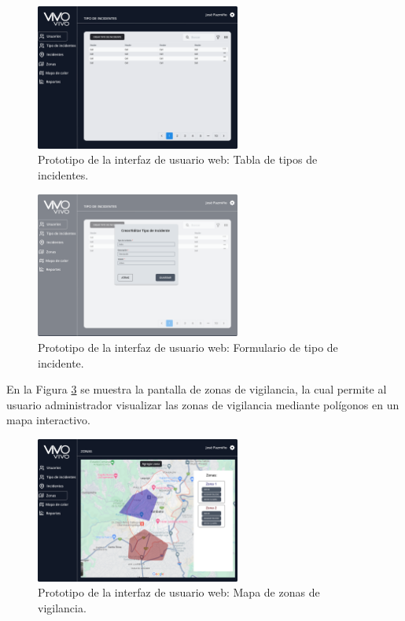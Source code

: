 \begin{figure}[H]
    \centering
    \includegraphics[width=0.6\textwidth]{chapters/III-resultados-y-discusion/resources/images/prototipo-tabla-tipos-incidentes-web.png}
    \caption{Prototipo de la interfaz de usuario web: Tabla de tipos de incidentes.}
    \label{fig:prototipo-tabla-tipos-incidentes-web}
\end{figure}

\begin{figure}[H]
    \centering
    \includegraphics[width=0.6\textwidth]{chapters/III-resultados-y-discusion/resources/images/prototipo-formulario-tipo-incidente-web.png}
    \caption{Prototipo de la interfaz de usuario web: Formulario de tipo de incidente.}
    \label{fig:prototipo-formulario-tipo-incidente-web}
\end{figure}

En la Figura \ref{fig:prototipo-mapa-zonas-de-vigilancia-web} se muestra la pantalla de zonas de vigilancia, la cual permite al usuario administrador
visualizar las zonas de vigilancia mediante polígonos en un mapa interactivo.

\begin{figure}[H]
    \centering
    \includegraphics[width=0.6\textwidth]{chapters/III-resultados-y-discusion/resources/images/prototipo-mapa-zonas-de-vigilancia-web.png}
    \caption{Prototipo de la interfaz de usuario web: Mapa de zonas de vigilancia.}
    \label{fig:prototipo-mapa-zonas-de-vigilancia-web}
\end{figure}

